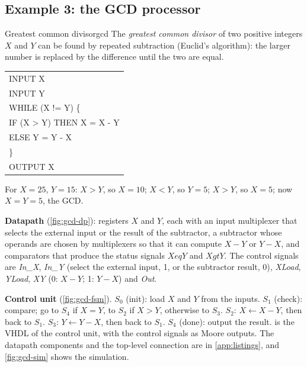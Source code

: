 

\subsection{Example 3: the GCD processor}
\begin{example}{Greatest common divisor}{gcd}
The \emph{greatest common divisor} of two positive integers $X$ and $Y$ can be found by repeated subtraction (Euclid's algorithm): the larger number is replaced by the difference until the two are equal.
\begin{center}\ttfamily\small
\begin{tabular}{@{}l@{}}
INPUT X\\ INPUT Y\\ WHILE (X != Y) \{\\ \quad IF (X > Y) THEN X = X - Y\\ \quad ELSE Y = Y - X\\ \}\\ OUTPUT X
\end{tabular}
\end{center}
For $X=25$, $Y=15$: $X>Y$, so $X=10$; $X<Y$, so $Y=5$; $X>Y$, so $X=5$; now $X=Y=5$, the GCD.

\textbf{Datapath} (\cref{fig:gcd-dp}): registers $X$ and $Y$, each with an input multiplexer that selects the external input or the result of the subtractor, a subtractor whose operands are chosen by multiplexers so that it can compute $X-Y$ or $Y-X$, and comparators that produce the status signals $XeqY$ and $XgtY$. The control signals are \textit{In\_X}, \textit{In\_Y} (select the external input, 1, or the subtractor result, 0), \textit{XLoad}, \textit{YLoad}, \textit{XY} (0: $X-Y$; 1: $Y-X$) and \textit{Out}.

\textbf{Control unit} (\cref{fig:gcd-fsm}). $S_0$ (init): load $X$ and $Y$ from the inputs. $S_1$ (check): compare; go to $S_4$ if $X=Y$, to $S_2$ if $X>Y$, otherwise to $S_3$. $S_2$: $X\leftarrow X-Y$, then back to $S_1$. $S_3$: $Y\leftarrow Y-X$, then back to $S_1$. $S_4$ (done): output the result.  is the VHDL of the control unit, with the control signals as Moore outputs. The datapath components and the top-level connection are in \cref{app:listings}, and \cref{fig:gcd-sim} shows the simulation.
\end{example}

